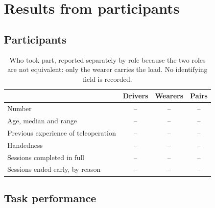 \chapter{Results from participants}
\label{ch:participant}

\begin{center}
\end{center}

\section{Participants}

\begin{table}[htbp]
  \centering
  \small
  \caption[Participants]{Who took part, reported separately by role because
  the two roles are not equivalent: only the wearer carries the load. No
  identifying field is recorded.}
  \label{tab:demographics}
  \begin{tabular}{@{}lccc@{}}
    \toprule
    & \textbf{Drivers} & \textbf{Wearers} & \textbf{Pairs} \\
    \midrule
    Number & -- & -- & -- \\
    Age, median and range & -- & -- & -- \\
    Previous experience of teleoperation & -- & -- & -- \\
    Handedness & -- & -- & -- \\
    Sessions completed in full & -- & -- & -- \\
    Sessions ended early, by reason & -- & -- & -- \\
    \bottomrule
  \end{tabular}
\end{table}

\section{Task performance}

